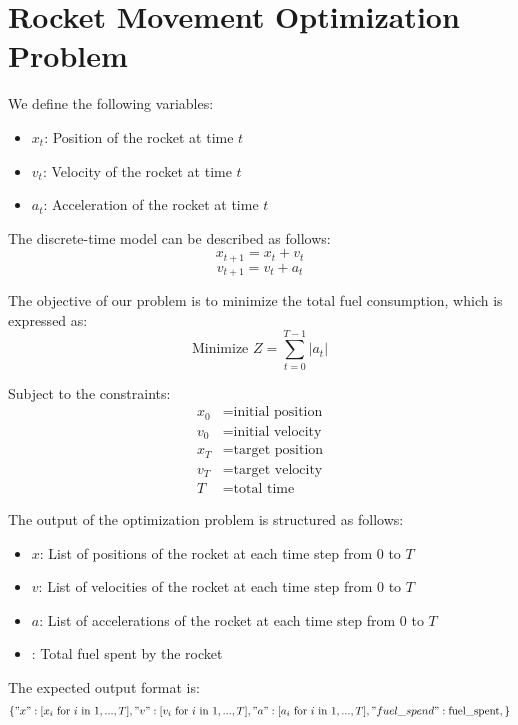 \documentclass{article}
\begin{document}
\section*{Rocket Movement Optimization Problem}

We define the following variables:
\begin{itemize}
    \item \( x_t \): Position of the rocket at time \( t \)
    \item \( v_t \): Velocity of the rocket at time \( t \)
    \item \( a_t \): Acceleration of the rocket at time \( t \)
\end{itemize}

The discrete-time model can be described as follows:
\[
x_{t+1} = x_t + v_t
\]
\[
v_{t+1} = v_t + a_t
\]

The objective of our problem is to minimize the total fuel consumption, which is expressed as:
\[
\text{Minimize } Z = \sum_{t=0}^{T-1} |a_t|
\]

Subject to the constraints:
\begin{align*}
x_0 &= \text{initial position} \\
v_0 &= \text{initial velocity} \\
x_T &= \text{target position} \\
v_T &= \text{target velocity} \\
T &= \text{total time}
\end{align*}

The output of the optimization problem is structured as follows:

\begin{itemize}
    \item \( x \): List of positions of the rocket at each time step from \( 0 \) to \( T \)
    \item \( v \): List of velocities of the rocket at each time step from \( 0 \) to \( T \)
    \item \( a \): List of accelerations of the rocket at each time step from \( 0 \) to \( T \)
    \item {}: Total fuel spent by the rocket
\end{itemize}

The expected output format is:
\[
\{
    "x": [x_i \text{ for } i \text{ in } 1, ..., T],
    "v": [v_i \text{ for } i \text{ in } 1, ..., T],
    "a": [a_i \text{ for } i \text{ in } 1, ..., T],
    "fuel\_spend": \text{fuel\_spent},
\}
\]
\end{document}
